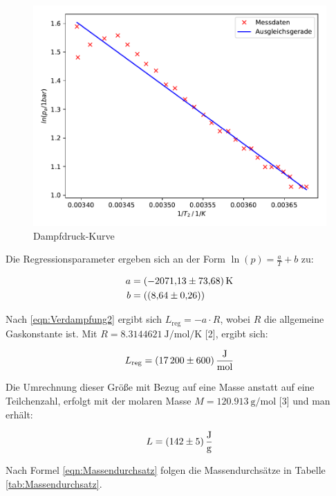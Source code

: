 \begin{figure}
  \centering
  \includegraphics[scale=0.8]{content/plot2.pdf}
  \caption{Dampfdruck-Kurve}
  \label{fig:plot2}
\end{figure}

Die Regressionsparameter ergeben sich an der Form $\ln({p}) = \frac{a}{T} +b$ 
zu:

\begin{align*}
a &= \SI{-2071.13+-73.68}{\kelvin}\\
b &= (\SI{8.64+-0.26}{})
\end{align*}

Nach \eqref{eqn:Verdampfung2} ergibt sich $L_\text{reg} = -a \cdot R$, wobei 
$R$ die allgemeine Gaskonstante ist. Mit 
$R = \SI{8.3144621}{\joule\per\mol\per\kelvin}$ [2], 
ergibt sich:

\begin{equation*}
L_\text{reg} = \SI{17200+-600}{\joule\per\mol}
\end{equation*}

Die Umrechnung dieser Größe mit Bezug auf eine Masse anstatt auf eine
Teilchenzahl, erfolgt mit der molaren Masse $M = \SI{120.913}{\gram\per\mol}$ [3]
und man erhält:

\begin{equation*}
L = \SI{142+-5}{\joule\per\gram}
\end{equation*}

Nach Formel \eqref{eqn:Massendurchsatz} folgen die Massendurchsätze in 
Tabelle \ref{tab:Massendurchsatz}. 

